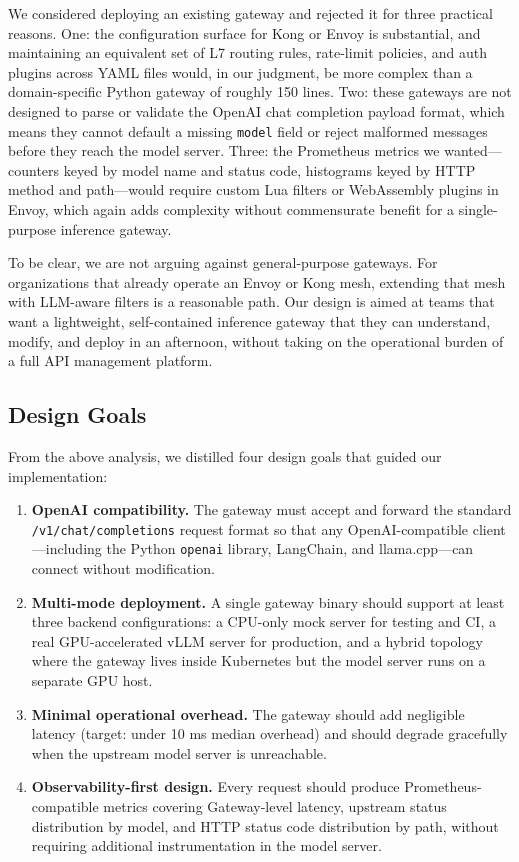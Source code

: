 \documentclass[10pt,journal]{IEEEtran}
\begin{document}
We considered deploying an existing gateway and rejected it for three practical reasons. One: the configuration surface for Kong or Envoy is substantial, and maintaining an equivalent set of L7 routing rules, rate-limit policies, and auth plugins across YAML files would, in our judgment, be more complex than a domain-specific Python gateway of roughly 150 lines. Two: these gateways are not designed to parse or validate the OpenAI chat completion payload format, which means they cannot default a missing \texttt{model} field or reject malformed messages before they reach the model server. Three: the Prometheus metrics we wanted---counters keyed by model name and status code, histograms keyed by HTTP method and path---would require custom Lua filters or WebAssembly plugins in Envoy, which again adds complexity without commensurate benefit for a single-purpose inference gateway.

To be clear, we are not arguing against general-purpose gateways. For organizations that already operate an Envoy or Kong mesh, extending that mesh with LLM-aware filters is a reasonable path. Our design is aimed at teams that want a lightweight, self-contained inference gateway that they can understand, modify, and deploy in an afternoon, without taking on the operational burden of a full API management platform.

\subsection{Design Goals}

From the above analysis, we distilled four design goals that guided our implementation:

\begin{enumerate}
  \item \textbf{OpenAI compatibility.} The gateway must accept and forward the standard \texttt{/v1/chat/completions} request format so that any OpenAI-compatible client---including the Python \texttt{openai} library, LangChain, and llama.cpp---can connect without modification.
  \item \textbf{Multi-mode deployment.} A single gateway binary should support at least three backend configurations: a CPU-only mock server for testing and CI, a real GPU-accelerated vLLM server for production, and a hybrid topology where the gateway lives inside Kubernetes but the model server runs on a separate GPU host.
  \item \textbf{Minimal operational overhead.} The gateway should add negligible latency (target: under 10 ms median overhead) and should degrade gracefully when the upstream model server is unreachable.
  \item \textbf{Observability-first design.} Every request should produce Prometheus-compatible metrics covering Gateway-level latency, upstream status distribution by model, and HTTP status code distribution by path, without requiring additional instrumentation in the model server.
\end{enumerate}
\end{document}
